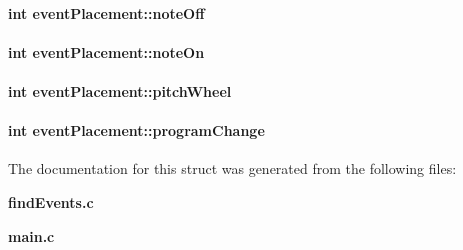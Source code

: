 \paragraph[{note\+Off}]{\setlength{\rightskip}{0pt plus 5cm}int event\+Placement\+::note\+Off}\label{structevent_placement_a3466f6aaaf7efc6fd7fc31f4fe41c11a}
\paragraph[{note\+On}]{\setlength{\rightskip}{0pt plus 5cm}int event\+Placement\+::note\+On}\label{structevent_placement_afda36632eb365d3abc4a44d17fd42f89}
\paragraph[{pitch\+Wheel}]{\setlength{\rightskip}{0pt plus 5cm}int event\+Placement\+::pitch\+Wheel}\label{structevent_placement_a518dafda61912ec33cc1db88e3e559fa}
\paragraph[{program\+Change}]{\setlength{\rightskip}{0pt plus 5cm}int event\+Placement\+::program\+Change}\label{structevent_placement_a047734cc2a3854a154c3717479cf88b0}


The documentation for this struct was generated from the following files\+:\begin{DoxyCompactItemize}
\item 
{\bf find\+Events.\+c}\item 
{\bf main.\+c}\end{DoxyCompactItemize}
